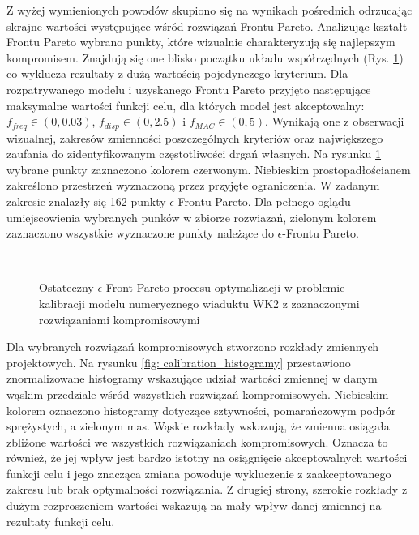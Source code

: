 Z wyżej wymienionych powodów skupiono się na wynikach pośrednich odrzucając skrajne wartości występujące wśród rozwiązań Frontu Pareto. Analizując kształt Frontu Pareto wybrano punkty, które wizualnie charakteryzują się najlepszym kompromisem. Znajdują się one blisko początku układu współrzędnych (Rys. \ref{fig: calibration_selected}) co wyklucza rezultaty z dużą wartością pojedynczego kryterium. Dla rozpatrywanego modelu i uzyskanego Frontu Pareto przyjęto następujące maksymalne wartości funkcji celu, dla których model jest akceptowalny: $f_{freq} \in (0,0.03)$, $f_{disp} \in (0,2.5)$ i $f_{MAC} \in (0,5)$. Wynikają one z obserwacji wizualnej, zakresów zmienności poszczególnych kryteriów oraz największego zaufania do zidentyfikowanym częstotliwości drgań własnych. Na rysunku \ref{fig: calibration_selected} wybrane punkty zaznaczono kolorem czerwonym. Niebieskim prostopadłościanem zakreślono przestrzeń wyznaczoną przez przyjęte ograniczenia. W zadanym zakresie znalazły się 162 punkty $\epsilon$-Frontu Pareto. Dla pełnego oglądu umiejscowienia wybranych punków w zbiorze rozwiazań, zielonym kolorem zaznaczono wszystkie wyznaczone punkty należące do $\epsilon$-Frontu Pareto. 

\begin{figure}[hbt!]
	\centering
	 \\
	\captionsetup{justification=centering}
	\caption{Ostateczny $\epsilon$-Front Pareto procesu optymalizacji w problemie kalibracji modelu numerycznego wiaduktu WK2 z zaznaczonymi rozwiązaniami kompromisowymi}
	\label{fig: calibration_selected}
\end{figure}

Dla wybranych rozwiązań kompromisowych stworzono rozkłady zmiennych projektowych. Na rysunku \ref{fig: calibration_histogramy} przestawiono znormalizowane histogramy wskazujące udział wartości zmiennej w danym wąskim przedziale wśród wszystkich rozwiązań kompromisowych. Niebieskim kolorem oznaczono histogramy dotyczące sztywności, pomarańczowym podpór sprężystych, a zielonym mas. Wąskie rozkłady wskazują, że zmienna osiągała zbliżone wartości we wszystkich rozwiązaniach kompromisowych. Oznacza to również, że jej wpływ jest bardzo istotny na osiągnięcie akceptowalnych wartości funkcji celu i jego znacząca zmiana powoduje wykluczenie z zaakceptowanego zakresu lub brak optymalności rozwiązania. Z drugiej strony, szerokie rozkłady z dużym rozproszeniem wartości wskazują na mały wpływ danej zmiennej na rezultaty funkcji celu. 

